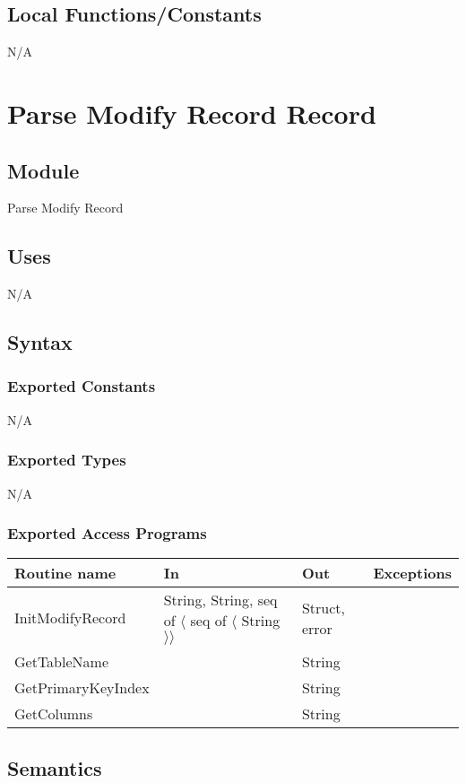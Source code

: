 \documentclass[12pt]{article}
\begin{document}
\subsection{Local Functions/Constants}
N/A


\newpage

\section{Parse Modify Record Record}

\subsection{Module}
Parse Modify Record

\subsection{Uses}
N/A

\subsection{Syntax}
\subsubsection{Exported Constants}
N/A

\subsubsection{Exported Types}
N/A

\subsubsection{Exported Access Programs}
\begin{tabular}{| l | l | l | l |}
\hline
\textbf{Routine name} & \textbf{In} & \textbf{Out} & \textbf{Exceptions}\\
\hline
InitModifyRecord & String, String, seq of $\langle$ seq of $\langle$ String $\rangle \rangle$ & Struct, error & \\
\hline
GetTableName & & String & \\
\hline
GetPrimaryKeyIndex & & String & \\
\hline
GetColumns & & String & \\
\hline
\end{tabular}

\subsection{Semantics}
\end{document}
